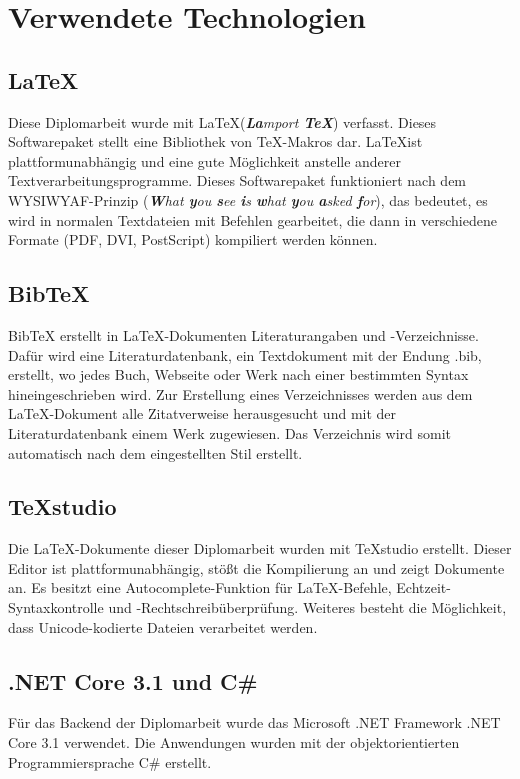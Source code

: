 \chapter{Verwendete Technologien} \label{technologien}

\section{\LaTeX}
Diese Diplomarbeit wurde mit \LaTeX \space (\textit{{\bf{\textit{La}}}mport {\bf{\textit{\TeX}}}}) verfasst. Dieses Softwarepaket stellt eine Bibliothek von \TeX-Makros dar. \LaTeX \space ist plattformunabhängig und eine gute Möglichkeit anstelle anderer Textverarbeitungsprogramme. Dieses Softwarepaket funktioniert nach dem WYSIWYAF-Prinzip (\textit{{\bf{W}}hat {\bf{y}}ou {\bf{s}}ee {\bf{i}}s {\bf{w}}hat {\bf{y}}ou {\bf{a}}sked {\bf{f}}or}), das bedeutet, es wird in normalen Textdateien mit Befehlen gearbeitet, die dann in verschiedene Formate (PDF, DVI, PostScript) kompiliert werden können. \autocite{wikiLatex}

\section{BibTeX}
BibTeX erstellt in \LaTeX-Dokumenten Literaturangaben und -Verzeichnisse. Dafür wird eine Literaturdatenbank, ein Textdokument mit der Endung .bib, erstellt, wo jedes Buch, Webseite oder Werk nach einer bestimmten Syntax hineingeschrieben wird. Zur Erstellung eines Verzeichnisses werden aus dem \LaTeX-Dokument alle Zitatverweise herausgesucht und mit der Literaturdatenbank einem Werk zugewiesen. Das Verzeichnis wird somit automatisch nach dem eingestellten Stil erstellt. \autocite{wikiBibtex}

\section{TeXstudio}
Die \LaTeX-Dokumente dieser Diplomarbeit wurden mit TeXstudio erstellt. Dieser Editor ist plattformunabhängig, stößt die Kompilierung an und zeigt Dokumente an. Es besitzt eine Autocomplete-Funktion für \LaTeX-Befehle, Echtzeit-Syntaxkontrolle und -Rechtschreibüberprüfung. Weiteres besteht die Möglichkeit, dass Unicode-kodierte Dateien verarbeitet werden. \autocite{wikiTexstudio}

\section{.NET Core 3.1 und C\#}
Für das Backend der Diplomarbeit wurde das Microsoft .NET Framework .NET Core 3.1 verwendet. Die Anwendungen wurden mit der objektorientierten Programmiersprache C\#  erstellt. \autocite{wikiDotnet}

